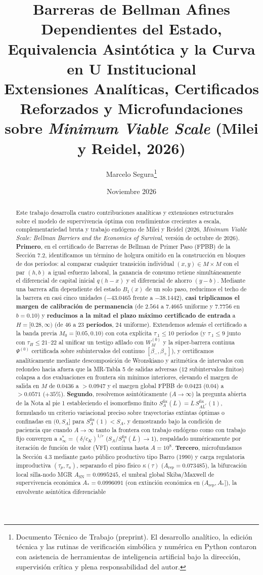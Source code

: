 \documentclass[11pt,letterpaper]{article}
\title{\textbf{Barreras de Bellman Afines Dependientes del Estado, Equivalencia Asintótica y la Curva en U Institucional}\\[0.5em]
\large Extensiones Analíticas, Certificados Reforzados y Microfundaciones sobre \emph{Minimum Viable Scale} (Milei y Reidel, 2026)}
\author{Marcelo Segura\thanks{Documento Técnico de Trabajo (preprint). El desarrollo analítico, la edición técnica y las rutinas de verificación simbólica y numérica en Python contaron con asistencia de herramientas de inteligencia artificial bajo la dirección, supervisión crítica y plena responsabilidad del autor.}}
\date{Noviembre 2026}
\theoremstyle{plain}
\begin{document}
\maketitle

\begin{abstract}
Este trabajo desarrolla cuatro contribuciones analíticas y extensiones estructurales sobre el modelo de supervivencia óptima con rendimientos crecientes a escala, complementariedad bruta y trabajo endógeno de Milei y Reidel (2026, \emph{Minimum Viable Scale: Bellman Barriers and the Economics of Survival}, versión de octubre de 2026). \textbf{Primero}, en el certificado de Barreras de Bellman de Primer Paso (FPBB) de la Sección 7.2, identificamos un término de holgura omitido en la construcción en bloques de dos períodos: al comparar cualquier transición individual $(x,y)\in M\times M$ con el par $(h,b)$ a igual esfuerzo laboral, la ganancia de consumo retiene simultáneamente el diferencial de capital inicial $q(h-x)$ y el diferencial de ahorro $(y-b)$. Mediante una barrera afín dependiente del estado $B_1(x)$ de un solo paso, reducimos el techo de la barrera en casi cinco unidades ($-43.0465$ frente a $-38.1442$), \textbf{casi triplicamos el margen de calibración de permanencia} (de $2.564$ a $7.4665$ uniforme y $7.7756$ en $b=0.10$) y \textbf{reducimos a la mitad el plazo máximo certificado de entrada} a $H=[0.28,\infty)$ (de $46$ a \textbf{$23$ períodos}, $24$ uniforme). Extendemos además el certificado a la banda previa $M_0=[0.05,0.10)$ con cota explícita $\tau_{.1}\le 10$ períodos (y $\tau_{.1}\le 9$ junto con $\tau_H\le 21$--$22$ al unificar un testigo afilado con $W_M^{(0)}$ y la súper-barrera continua $\Psi^{(0)}$ certificada sobre subintervalos del continuo $[\beta_-,\beta_+]$), y certificamos analíticamente mediante descomposición de Wronskiano y aritmética de intervalos con redondeo hacia afuera que la MR-Tabla 5 de salidas adversas ($12$ subintervalos finitos) colapsa a dos evaluaciones en frontera sin mínimos interiores, elevando el margen de salida en $M$ de $0.0436$ a $>0.0947$ y el margen global FPBB de $0.0423$ ($0.04$) a \textbf{$>0.0571$} ($+35\%$). \textbf{Segundo}, resolvemos asintóticamente ($A\to\infty$) la pregunta abierta de la Nota al pie 1 estableciendo el isomorfismo finito $S_A^{\mathrm{fix}}(\overline{L}) = \overline{L}\,S_{A\overline{L}^r}^{\mathrm{fix}}(1)$, formulando un criterio variacional preciso sobre trayectorias extintas óptimas o confinadas en $(0,S_A]$ para $S_A^{\mathrm{fix}}(1) < S_A$, y demostrando bajo la condición de paciencia que cuando $A\to\infty$ tanto la frontera con trabajo endógeno como con trabajo fijo convergen a $s_\infty^*=(\delta/c_K)^{1/r}$ ($S_A/S_A^{\mathrm{fix}}(\overline{L})\to 1$), respaldado numéricamente por iteración de función de valor (VFI) continua hasta $A=10^8$. \textbf{Tercero}, microfundamos la Sección 4.3 mediante gasto público productivo tipo Barro (1990) y carga regulatoria improductiva $(\tau_p,\tau_u)$, separando el piso físico $\kappa(\tau)$ ($A_{\mathrm{rep}}=0.073485$), la bifurcación local silla-nodo MGR $A_{\mathrm{SN}}=0.0995245$, el umbral global Skiba/Maxwell de supervivencia económica $A_*=0.0996091$ (con extinción económica en $(A_{\mathrm{rep}},A_*]$), la envolvente asintótica diferenciable 
\end{abstract}
\end{document}
